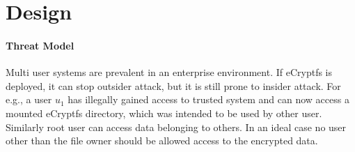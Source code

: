 \section{Design}
\label{Design}

%
%
%
%
%
%
%
%
%
%
%
%
%
%
%
%
%
%
%
%
%

\paragraph{Threat Model}
Multi user systems are prevalent in an enterprise environment.  If
eCryptfs is deployed, it can stop outsider attack, but it is still
prone to insider attack.  For e.g., a user $u_1$ has illegally gained
access to trusted system and can now access a mounted eCryptfs
directory, which was intended to be used by other user.  Similarly
root user can access data belonging to others.  In an ideal case no
user other than the file owner should be allowed access to the
encrypted data.

